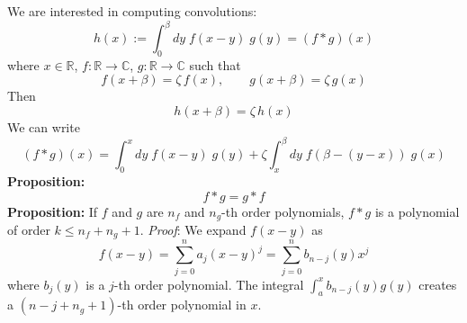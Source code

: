 \documentclass{article}
\begin{document}
We are interested in computing convolutions:
$$
h(x):=\int_{0}^\beta dy\;f(x-y)\;g(y)= (f*g)(x)
$$
where $x\in\mathbb{R}$, $f:\mathbb{R}\to \mathbb{C}$, $g:\mathbb{R}\to\mathbb{C}$ such that
$$
f(x+\beta) = \zeta\,  f(x),\qquad g(x+\beta) = \zeta\, g(x)
$$
Then
$$
h(x+\beta)=\zeta\, h(x)
$$
We can write
$$
(f*g)(x)=\int_0^x dy\;f(x-y)\;g(y)+\zeta\int_x^\beta dy\; f(\beta-(y-x)) \; g(x)
$$
{\bf Proposition:}
$$
f*g = g*f
$$
{\bf Proposition:} If $f$ and $g$ are $n_f$ and $n_g$-th order polynomials, $f*g$ is a polynomial of order $k\le n_f+n_g+1$.\newline
{\it Proof}: We expand $f(x-y)$ as
$$
f(x-y) = \sum_{j=0}^n a_j (x-y)^j = \sum_{j=0}^n b_{n-j}(y) x^j
$$
where $b_j(y)$ is a $j$-th order polynomial. The integral $\int_{a}^x b_{n-j}(y)g(y)$ creates a $(n-j+n_g+1)$-th order polynomial in $x$. 
\end{document}
